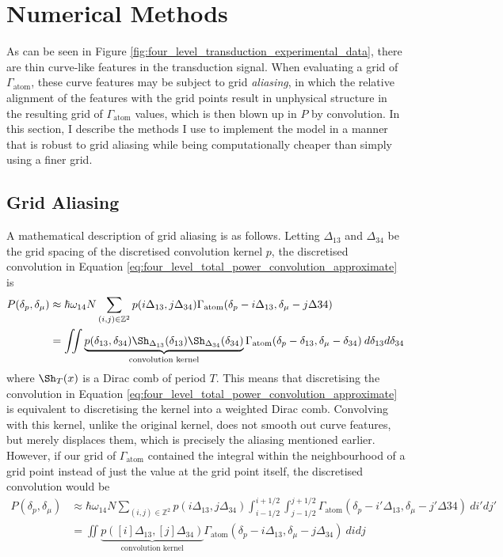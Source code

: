 \section{Numerical Methods}
As can be seen in Figure \ref{fig:four_level_transduction_experimental_data}, there are thin curve-like features in the transduction signal. When evaluating a grid of $\Gamma_\text{atom}$, these curve features may be subject to grid \textit{aliasing}, in which the relative alignment of the features with the grid points result in unphysical structure in the resulting grid of $\Gamma_\text{atom}$ values, which is then blown up in $P$ by convolution. In this section, I describe the methods I use to implement the model in a manner that is robust to grid aliasing while being computationally cheaper than simply using a finer grid.

\subsection{Grid Aliasing}
A mathematical description of grid aliasing is as follows. Letting $\Delta_{13}$ and $\Delta_{34}$ be the grid spacing of the discretised convolution kernel $p$, the discretised convolution in Equation \ref{eq:four_level_total_power_convolution_approximate} is
\begin{align}
    P(\delta_p, \delta_\mu) &\approx \hbar\omega_{14}N \sum_{(i,j)\in\mathbb{Z}^2} p(i\Delta_{13}, j\Delta_{34}) \Gamma_\text{atom}(\delta_p-i\Delta_{13}, \delta_\mu-j\Delta{34})\\
    &= \iint \underbrace{p(\delta_{13}, \delta_{34}) \Sh_{\Delta_{13}}(\delta_{13}) \Sh_{\Delta_{34}}(\delta_{34})}_\text{convolution kernel} \Gamma_\text{atom}(\delta_p-\delta_{13}, \delta_\mu-\delta_{34})\:d\delta_{13}d\delta_{34}
\end{align}
where $\Sh_T(x)$ is a Dirac comb of period $T$. This means that discretising the convolution in Equation \ref{eq:four_level_total_power_convolution_approximate} is equivalent to discretising the kernel into a weighted Dirac comb. Convolving with this kernel, unlike the original kernel, does not smooth out curve features, but merely displaces them, which is precisely the aliasing mentioned earlier. However, if our grid of $\Gamma_\text{atom}$ contained the integral within the neighbourhood of a grid point instead of just the value at the grid point itself, the discretised convolution would be
\begin{align}
    P(\delta_p, \delta_\mu) &\approx \hbar\omega_{14}N \sum_{(i,j)\in\mathbb{Z}^2} p(i\Delta_{13}, j\Delta_{34}) \int_{i-1/2}^{i+1/2} \int_{j-1/2}^{j+1/2} \Gamma_\text{atom}(\delta_p-i'\Delta_{13}, \delta_\mu-j'\Delta{34})\:di'dj'\\
    &= \iint \underbrace{p([i]\Delta_{13}, [j]\Delta_{34})}_\text{convolution kernel} \Gamma_\text{atom}(\delta_p-i\Delta_{13}, \delta_\mu-j\Delta_{34})\:didj
\end{align}
